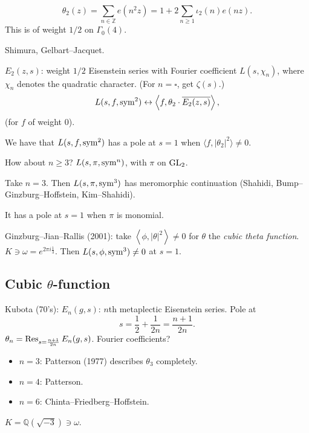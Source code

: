 \documentclass[reqno]{amsart} 
\begin{document}
\begin{equation*}
\theta_2(z) = \sum_{n \in \mathbb{Z} } e(n^2 z) = 1 + 2 \sum_{n \geq 1} \iota_2(n) e(n z).
\end{equation*}
This is of weight $1/2$ on $\Gamma_0(4)$.

Shimura, Gelbart--Jacquet.

$E_2(z, s)$: weight $1/2$ Eisenstein series with Fourier coefficient $L(s, \chi_n)$, where $\chi_n$ denotes the quadratic character.  (For $n = \square$, get $\zeta(s)$.)
\begin{equation*}
L(s, f, \operatorname{sym}^2) \leftrightarrow \left\langle f, \theta_2 \cdot \overline{E_2(z, s)} \right\rangle,
\end{equation*}
(for $f$ of weight $0$).

We have that $L(s, f, \operatorname{sym}^2)$ has a pole at $s = 1$ when $\langle f, \lvert \theta_2 \rvert^2 \rangle \neq 0$.

How about $n \geq 3$?  $L(s, \pi, \operatorname{sym}^n)$, with $\pi$ on $\operatorname{GL}_2$.

Take $n = 3$.  Then $L(s, \pi, \operatorname{sym}^3)$ has meromorphic continuation (Shahidi, Bump--Ginzburg--Hoffstein, Kim--Shahidi).

It has a pole at $s = 1$ when $\pi$ is monomial.

Ginzburg--Jian--Rallis (2001): take $\left\langle \phi, \lvert \theta  \rvert^2  \right\rangle \neq 0$ for $\theta$ the \emph{cubic theta function}.
$K \ni \omega = e^{2 \pi i \tfrac{1}{3}}$.  Then $L(s, \phi, \operatorname{sym}^3) \neq 0$ at $s = 1$.

\subsection{Cubic $\theta$-function}
Kubota (70's): $E_n(g, s)$: $n$th metaplectic Eisenstein series.  Pole at
\begin{equation*}
  s = \frac{1}{2} + \frac{1}{2 n} = \frac{n + 1}{2 n}.
\end{equation*}
$\theta_n = \operatorname{Res}_{s = \frac{n + 1}{2 n}} E_n(g, s)$.  Fourier coefficients?
\begin{itemize}
\item $n = 3$: Patterson (1977) describes $\theta_3$ completely.
\item $n = 4$: Patterson.
\item $n = 6$: Chinta--Friedberg--Hoffstein.
\end{itemize}

$K = \mathbb{Q}(\sqrt{-3}) \ni \omega$.
\end{document}
